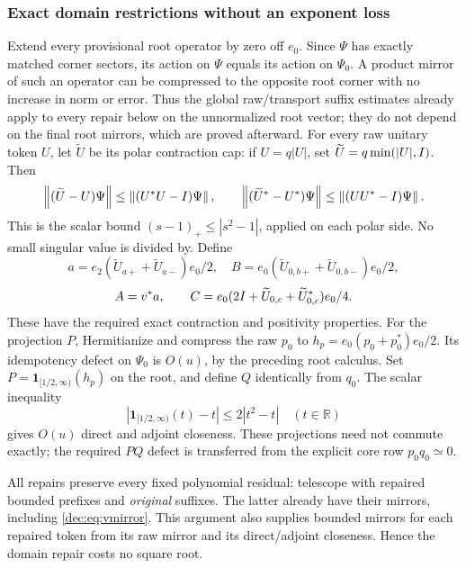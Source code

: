 \subsubsection{Exact domain restrictions without an exponent loss}
Extend every provisional root operator by zero off $e_0$. Since $\Psi$ has exactly matched corner sectors, its action on $\Psi$ equals its action on $\Psi_0$. A product mirror of such an operator can be compressed to the opposite root corner with no increase in norm or error. Thus the global raw/transport suffix estimates already apply to every repair below on the unnormalized root vector; they do not depend on the final root mirrors, which are proved afterward.
For every raw unitary token $U$, let $\widetilde U$ be its polar contraction cap: if $U=q|U|$, set $\widetilde U=q\min(|U|,I)$. Then
\begin{equation}\label{dec:eq:cap}
\left\lVert(\widetilde U-U)\Psi\right\rVert\le\left\lVert(U^*U-I)\Psi\right\rVert,\qquad
\left\lVert(\widetilde U^*-U^*)\Psi\right\rVert\le\left\lVert(UU^*-I)\Psi\right\rVert.
\end{equation}
This is the scalar bound $(s-1)_+\le|s^2-1|$, applied on each polar side. No small singular value is divided by.
Define
\[
a=e_2(\widetilde U_{a+}+\widetilde U_{a-})e_0/2,\quad
B=e_0(\widetilde U_{0,b+}+\widetilde U_{0,b-})e_0/2,
\]
\[
A=v^*a,\qquad
C=e_0(2I+\widetilde U_{0,c}+\widetilde U_{0,c}^*)e_0/4.
\]
These have the required exact contraction and positivity properties. For the projection $P$, Hermitianize and compress the raw $p_0$ to
$h_p=e_0(p_0+p_0^*)e_0/2$. Its idempotency defect on $\Psi_0$ is $O(u)$, by the preceding root calculus. Set
$P=\mathbf1_{[1/2,\infty)}(h_p)$ on the root, and define $Q$ identically from $q_0$. The scalar inequality
\begin{equation}\label{dec:eq:threshold}
|\mathbf1_{[1/2,\infty)}(t)-t|\le2|t^2-t|\quad(t\in\mathbb R)
\end{equation}
gives $O(u)$ direct and adjoint closeness. These projections need not commute exactly; the required $PQ$ defect is transferred from the explicit core row $p_0q_0\simeq0$.

All repairs preserve every fixed polynomial residual: telescope with repaired bounded prefixes and \emph{original} suffixes. The latter already have their mirrors, including \eqref{dec:eq:vmirror}. This argument also supplies bounded mirrors for each repaired token from its raw mirror and its direct/adjoint closeness. Hence the domain repair costs no square root.

